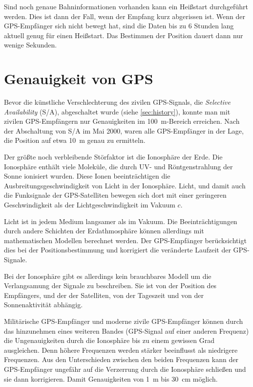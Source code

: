 \documentclass[12pt,a4paper]{scrartcl}
\begin{document}
Sind noch genaue Bahninformationen vorhanden kann ein Heißstart durchgeführt werden. Dies ist dann der Fall, wenn der Empfang kurz abgerissen ist. Wenn der GPS-Empfänger sich nicht bewegt hat, sind die Daten bis zu 6 Stunden lang aktuell genug für einen Heißstart. Das Bestimmen der Position dauert dann nur wenige Sekunden.

\section{Genauigkeit von GPS}
\label{sec:accuracy}

Bevor die künstliche Verschlechterung des zivilen GPS-Signals, die \emph{Selective Availability} (S/A), abgeschaltet wurde (siehe \ref{sec:history}), konnte man mit zivilen GPS-Empfängern nur Genauigkeiten im \SI{100}{\meter}-Bereich erreichen. Nach der Abschaltung von S/A im Mai 2000, waren alle GPS-Empfänger in der Lage, die Position auf etwa \SI{10}{m} genau zu ermitteln.

Der größte noch verbleibende Störfaktor ist die Ionosphäre der Erde. Die Ionosphäre enthält viele Moleküle, die durch UV- und Röntgenstrahlung der Sonne ionisiert wurden. Diese Ionen beeinträchtigen die Ausbreitungsgeschwindigkeit von Licht in der Ionosphäre. Licht, und damit auch die Funksignale der GPS-Satelliten bewegen sich dort mit einer geringeren Geschwindigkeit als der Lichtgeschwindigkeit im Vakuum $c$.

Licht ist in jedem Medium langsamer als im Vakuum. Die Beeinträchtigungen durch andere Schichten der Erdathmosphäre können allerdings mit mathematischen Modellen berechnet werden. Der GPS-Empfänger berücksichtigt dies bei der Positionsbestimmung und korrigiert die veränderte Laufzeit der GPS-Signale.

Bei der Ionosphäre gibt es allerdings kein brauchbares Modell um die Verlangsamung der Signale zu beschreiben. Sie ist von der Position des Empfängers, und der der Satelliten, von der Tageszeit und von der Sonnenaktivität abhängig.

Militärische GPS-Empfänger und moderne zivile GPS-Empfänger können durch das hinzunehmen eines weiteren Bandes (GPS-Signal auf einer anderen Frequenz) die Ungenauigkeiten durch die Ionosphäre bis zu einem gewissen Grad ausgleichen. Denn höhere Frequenzen werden stärker beeinflusst als niedrigere Frequenzen. Aus den Unterschieden zwischen den beiden Frequenzen kann der GPS-Empfänger ungefähr auf die Verzerrung durch die Ionosphäre schließen und sie dann korrigieren. Damit Genauigkeiten von \SI{1}{\meter} bis \SI{30}{\centi\meter} möglich.
\end{document}
